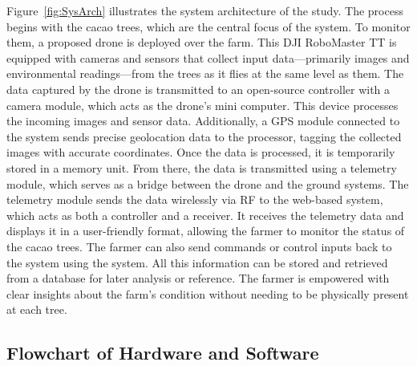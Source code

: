 Figure~\ref{fig:SysArch} illustrates the system architecture of the study. The process begins with the cacao trees, which are the central focus of the system. To monitor them, a proposed drone is deployed over the farm. This DJI RoboMaster TT is equipped with cameras and sensors that collect input data—primarily images and environmental readings—from the trees as it flies at the same level as them. The data captured by the drone is transmitted to an open-source controller with a camera module, which acts as the drone’s mini computer. This device processes the incoming images and sensor data. Additionally, a GPS module connected to the system sends precise geolocation data to the processor, tagging the collected images with accurate coordinates. Once the data is processed, it is temporarily stored in a memory unit. From there, the data is transmitted using a telemetry module, which serves as a bridge between the drone and the ground systems. The telemetry module sends the data wirelessly via RF to the web-based system, which acts as both a controller and a receiver. It receives the telemetry data and displays it in a user-friendly format, allowing the farmer to monitor the status of the cacao trees. The farmer can also send commands or control inputs back to the system using the system. All this information can be stored and retrieved from a database for later analysis or reference. The farmer is empowered with clear insights about the farm’s condition without needing to be physically present at each tree.

\subsection{Flowchart of Hardware and Software}

